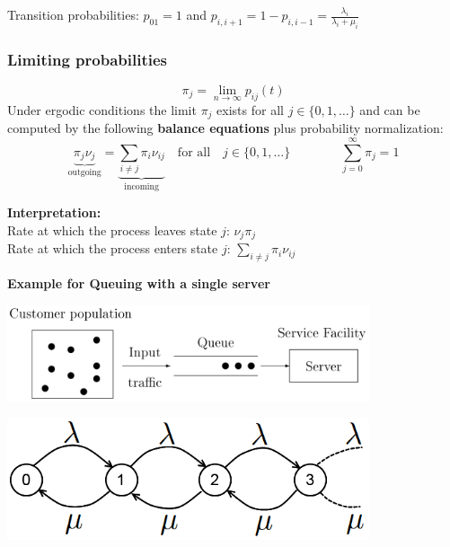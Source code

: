 Transition probabilities: $p_{01}=1$ and $p_{i,i+1}=1-p_{i,i-1}=\frac{\lambda_i}{\lambda_i+\mu_i}$

\subsubsection{Limiting probabilities }
$$\pi_j=\lim\limits_{n\rightarrow \infty}{p_{ij}(t)}$$
Under ergodic conditions the limit $\pi_j$ exists for all $j \in\{0,1,\ldots\}$ and can be computed by the following \textbf{balance equations} plus probability normalization:
$$\boxed{\underbrace{\pi_j\nu_j}_{\text{outgoing}}=\underbrace{\sum\limits_{i\neq j}{\pi_i \nu_{ij}}}_{\text{incoming}}\quad \text{for all} \quad j\in\{0,1,\ldots \}
\qquad \qquad \sum\limits_{j=0}^{\infty}{\pi_j=1}}$$

\textbf{Interpretation: }\\
Rate at which the process leaves state $j$: $\nu_j\pi_j$\\
Rate at which the process enters state $j$: $\sum\limits_{i\neq j}{\pi_i \nu_{ij}}$

\textbf{Example for Queuing with a single server}\\
\begin{minipage}{10.5cm}
\includegraphics[width=0.8\textwidth]{Content/Markov/Queue.png}
\end{minipage}
\hfill
\begin{minipage}{7.5cm}
\includegraphics[width=0.8\textwidth]{Content/Markov/queieingGraph.png}
\end{minipage}


